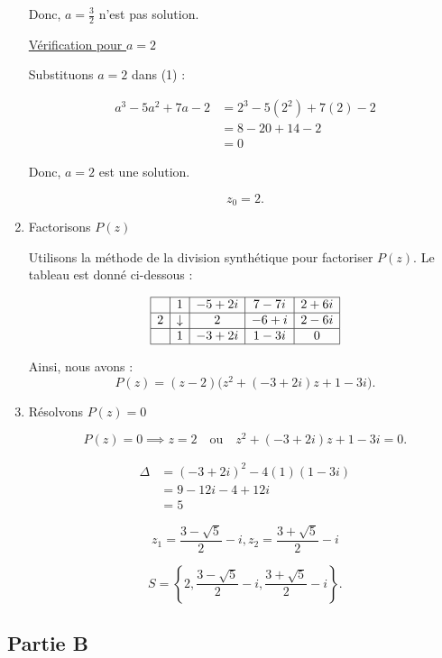 \documentclass[12pt,a4paper]{article}
\begin{document}
\begin{enumerate}
Donc, $a = \frac{3}{2}$ n'est pas solution.

\underline{Vérification pour $a = 2$}

Substituons $a = 2$ dans (1) :

\begin{align*}
a^3 - 5a^2 + 7a - 2 &= 2^3 - 5(2^2) + 7(2) - 2\\
										&=8 - 20 + 14 - 2\\
										&=0
\end{align*}

Donc, $a = 2$ est une solution.

\[
z_0 = 2.
\]

\item Factorisons $P(z)$

Utilisons la méthode de la division synthétique pour factoriser $P(z)$. Le tableau est donné ci-dessous :

\[
\begin{array}{|c|c|c|c|c|}
\hline
\text{ } & 1 & -5+2i & 7-7i & 2+6i \\ 
\hline
2 & \downarrow & 2 & -6+i & 2-6i \\ 
\hline
\text{ } & 1 & -3+2i & 1-3i & 0 \\ 
\hline
\end{array}
\]

Ainsi, nous avons :
\[
P(z) = (z - 2)\big(z^2 + (-3+2i)z + 1-3i\big).
\]

\item Résolvons $P(z) = 0$

\[
P(z) = 0 \implies z = 2 \quad \text{ou} \quad z^2 + (-3+2i)z + 1-3i = 0.
\]

\begin{align*}
\Delta &= (-3+2i)^2 - 4(1)(1-3i)\\
 			 &= 9 - 12i - 4 + 12i\\
	     &= 5
\end{align*}

\[
z_{1} = \frac{3-\sqrt{5}}{2}-i, z_{2} = \frac{3+\sqrt{5}}{2}-i
\]

\[
S = \left\{ 2, \frac{3-\sqrt{5}}{2}-i, \frac{3+\sqrt{5}}{2}-i \right\}.
\]

\end{enumerate}
\subsection*{ Partie B}
\end{document}
